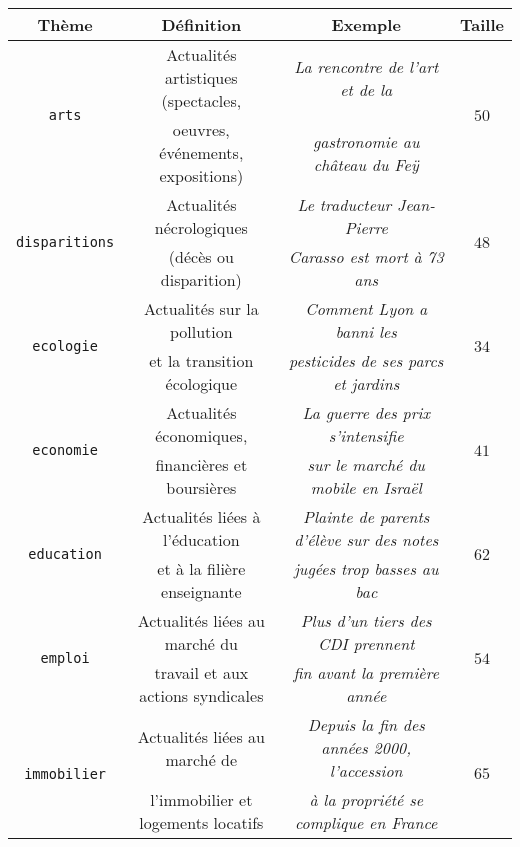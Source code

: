	\begin{table}[!htb]
		\begin{center}
		\begin{scriptsize}
		\begin{tabular}{|c|c|c|c|}
		
			\hline
			\textbf{Thème}
				& \textbf{Définition}
				& \textbf{Exemple}
				& \textbf{Taille}
				\tabularnewline
				\hline
			
			\multirow{2}{*}{\texttt{arts}}
				& Actualités artistiques (spectacles,
				& \textit{La rencontre de l'art et de la }
				& \multirow{2}{*}{$50$}
				\tabularnewline
				& oeuvres, événements, expositions)
				& \textit{gastronomie au château du Feÿ}
				&
				\tabularnewline
				\hline
			\multirow{2}{*}{\texttt{disparitions}}
				& Actualités nécrologiques 
				& \textit{Le traducteur Jean-Pierre}
				& \multirow{2}{*}{$48$}
				\tabularnewline
				& (décès ou disparition)
				& \textit{Carasso est mort à 73 ans}
				&
				\tabularnewline
				\hline
			\multirow{2}{*}{\texttt{ecologie}}
				& Actualités sur la pollution
				& \textit{Comment Lyon a banni les}
				& \multirow{2}{*}{$34$}
				\tabularnewline
				& et la transition écologique
				& \textit{pesticides de ses parcs et jardins}
				&
				\tabularnewline
				\hline
			\multirow{2}{*}{\texttt{economie}}
				& Actualités économiques,
				& \textit{La guerre des prix s'intensifie}
				& \multirow{2}{*}{$41$}
				\tabularnewline
				& financières et boursières
				& \textit{sur le marché du mobile en Israël}
				&
				\tabularnewline
				\hline
			\multirow{2}{*}{\texttt{education}}
				& Actualités liées à l'éducation
				& \textit{Plainte de parents d'élève sur des notes}
				& \multirow{2}{*}{$62$}
				\tabularnewline
				& et à la filière enseignante
				& \textit{jugées trop basses au bac}
				&
				\tabularnewline
				\hline
			\multirow{2}{*}{\texttt{emploi}}
				& Actualités liées au marché du
				& \textit{Plus d'un tiers des CDI prennent}
				& \multirow{2}{*}{$54$}
				\tabularnewline
				& travail et aux actions syndicales
				& \textit{ fin avant la première année}
				&
				\tabularnewline
				\hline
			\multirow{2}{*}{\texttt{immobilier}}
				& Actualités liées au marché de
				& \textit{Depuis la fin des années 2000, l'accession}
				& \multirow{2}{*}{$65$}
				\tabularnewline
				& l'immobilier et logements locatifs
				& \textit{à la propriété se complique en France}
				&
				\tabularnewline
				\hline

\end{tabular}
\end{scriptsize}
\end{center}
\end{table}
